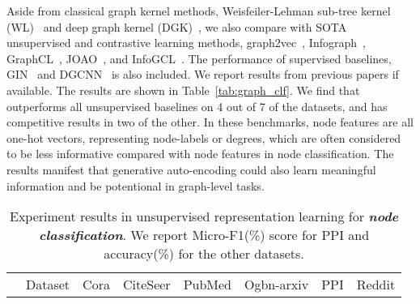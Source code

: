 {
Aside from classical graph kernel methods, Weisfeiler-Lehman sub-tree kernel (WL)~\cite{shervashidze2011weisfeiler} and deep graph kernel (DGK)~\cite{yanardag2015deep}, we also compare \model with SOTA unsupervised and contrastive learning methods, graph2vec~\cite{narayanan2017graph2vec}, Infograph~\cite{sun2019infograph}, GraphCL~\cite{you2020graph}, JOAO~\cite{you2021graph}, and InfoGCL~\cite{Xu2021InfoGCLIG}. The performance of supervised baselines, GIN~\cite{xu2019powerful} and DGCNN~\cite{Zhang2018AnED} is also included. We report results from previous papers if available.
The results are shown in Table~\ref{tab:graph_clf}.
We find that \model outperforms all unsupervised baselines on 4 out of 7 of the datasets, and has competitive results in two of the other. In these benchmarks, node features are all one-hot vectors, representing node-labels or degrees, which are often considered to be less informative compared with node features in node classification.  The results manifest that generative auto-encoding could also learn meaningful information and be potentional in graph-level tasks.









\begin{table*}[htbp]
    \centering
    \caption{\textmd{Experiment results in unsupervised representation learning for \textbf{\textit{node classification}}. We report Micro-F1(\%) score for PPI and accuracy(\%) for the other datasets. }}
    \begin{threeparttable}
    \renewcommand\tabcolsep{8pt}
    \begin{tabular}{c|c|cccccc}
        \toprule[1.2pt]
            & Dataset &   Cora      & CiteSeer      & PubMed                & Ogbn-arxiv        & PPI               & Reddit        \\



\end{tabular}
\end{threeparttable}
\end{table*}}
